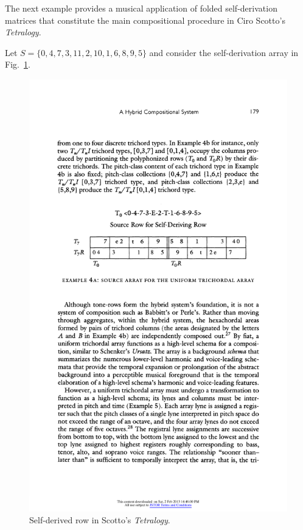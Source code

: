 The next example provides a musical application of folded self-derivation matrices that constitute the main compositional procedure in Ciro Scotto's \emph{Tetralogy}.

\begin{example}
    \cite[180]{Scotto2000}
    \label{ex:scotto}
    Let $S = \{ 0, 4, 7, 3, 11, 2, 10, 1, 6, 8, 9, 5 \}$ and consider the self-derivation array in Fig.~\ref{fig:scotto-array}.
    
    \begin{figure}[htbp]
    	\centering
    	\includegraphics[width=5in]{figures/scotto-array.pdf}
		\caption[Self-derived row in Scotto's \emph{Tetralogy}]{Self-derived row in Scotto's \emph{Tetralogy}.}
    	\label{fig:scotto-array}
	\end{figure}
	

\end{example}
